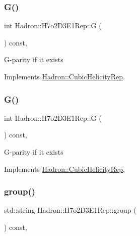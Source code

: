 \subsubsection{\texorpdfstring{G()}{G()}\hspace{0.1cm}{\footnotesize\ttfamily [1/2]}}
{\footnotesize\ttfamily int Hadron\+::\+H7o2\+D3\+E1\+Rep\+::G (\begin{DoxyParamCaption}{ }\end{DoxyParamCaption}) const\hspace{0.3cm}{\ttfamily [inline]}, {\ttfamily [virtual]}}

G-\/parity if it exists 

Implements \mbox{\hyperlink{structHadron_1_1CubicHelicityRep_a50689f42be1e6170aa8cf6ad0597018b}{Hadron\+::\+Cubic\+Helicity\+Rep}}.

\mbox{\label{structHadron_1_1H7o2D3E1Rep_aa0ecdf06110537889da13443632785a6}} 
\subsubsection{\texorpdfstring{G()}{G()}\hspace{0.1cm}{\footnotesize\ttfamily [2/2]}}
{\footnotesize\ttfamily int Hadron\+::\+H7o2\+D3\+E1\+Rep\+::G (\begin{DoxyParamCaption}{ }\end{DoxyParamCaption}) const\hspace{0.3cm}{\ttfamily [inline]}, {\ttfamily [virtual]}}

G-\/parity if it exists 

Implements \mbox{\hyperlink{structHadron_1_1CubicHelicityRep_a50689f42be1e6170aa8cf6ad0597018b}{Hadron\+::\+Cubic\+Helicity\+Rep}}.

\mbox{\label{structHadron_1_1H7o2D3E1Rep_a9a25c1c49d874a36ad6a3c82522d0482}} 
\subsubsection{\texorpdfstring{group()}{group()}\hspace{0.1cm}{\footnotesize\ttfamily [1/3]}}
{\footnotesize\ttfamily std\+::string Hadron\+::\+H7o2\+D3\+E1\+Rep\+::group (\begin{DoxyParamCaption}{ }\end{DoxyParamCaption}) const\hspace{0.3cm}{\ttfamily [inline]}, {\ttfamily [virtual]}}

